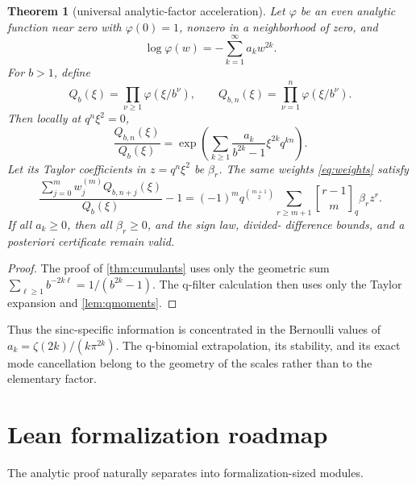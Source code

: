 \documentclass[11pt]{article}
\newtheorem{theorem}{Theorem}[section]
\theoremstyle{definition}
\theoremstyle{remark}
\newcommand{\qbinom}[2]{\genfrac{[}{]}{0pt}{}{#1}{#2}_{q}}
\begin{document}
\begin{theorem}[universal analytic-factor acceleration]
\label{thm:universal}
Let \(\varphi\) be an even analytic function near zero with \(\varphi(0)=1\),
nonzero in a neighborhood of zero, and
\begin{equation}
 \log\varphi(w)=-\sum_{k=1}^{\infty}a_kw^{2k}.
 \label{eq:generalphi}
\end{equation}
For \(b>1\), define
\[
 Q_b(\xi)=\prod_{\nu\geq1}\varphi(\xi/b^\nu),
 \qquad Q_{b,n}(\xi)=\prod_{\nu=1}^n\varphi(\xi/b^\nu).
\]
Then locally at \(q^n\xi^2=0\),
\begin{equation}
 \frac{Q_{b,n}(\xi)}{Q_b(\xi)}
 =\exp\!\left(\sum_{k\geq1}
 \frac{a_k}{b^{2k}-1}\xi^{2k}q^{kn}\right).
 \label{eq:universalTail}
\end{equation}
Let its Taylor coefficients in \(z=q^n\xi^2\) be \(\beta_r\). The same weights
\eqref{eq:weights} satisfy
\begin{equation}
 \frac{\sum_{j=0}^mw_j^{(m)}Q_{b,n+j}(\xi)}{Q_b(\xi)}-1
 =(-1)^mq^{\binom{m+1}{2}}
 \sum_{r\geq m+1}\qbinom{r-1}{m}\beta_r z^r.
 \label{eq:universalError}
\end{equation}
If all \(a_k\geq0\), then all \(\beta_r\geq0\), and the sign law, divided-
difference bounds, and a posteriori certificate remain valid.
\end{theorem}

\begin{proof}
The proof of \cref{thm:cumulants} uses only the geometric sum
\(\sum_{\ell\geq1}b^{-2k\ell}=1/(b^{2k}-1)\). The q-filter calculation then
uses only the Taylor expansion and \cref{lem:qmoments}.
\end{proof}

Thus the sinc-specific information is concentrated in the Bernoulli values of
\(a_k=\zeta(2k)/(k\pi^{2k})\). The q-binomial extrapolation, its stability, and
its exact mode cancellation belong to the geometry of the scales rather than to
the elementary factor.

\section{Lean formalization roadmap}
\label{sec:lean}

The analytic proof naturally separates into formalization-sized modules.
\end{document}
